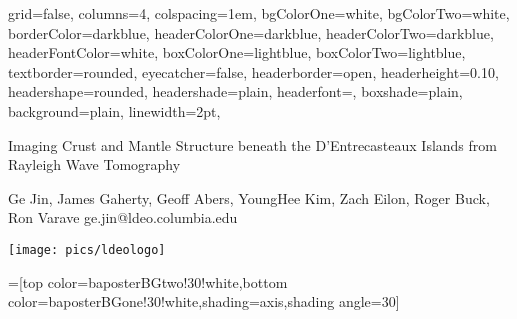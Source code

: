 \documentclass[paperwidth=65in,paperheight=43in,landscape,final,fontscale=0.23]{baposter}
\begin{document}
\begin{poster}{
  grid=false,
  columns=4,
  colspacing=1em,
  bgColorOne=white,
  bgColorTwo=white,
  borderColor=darkblue,
  headerColorOne=darkblue,
  headerColorTwo=darkblue,
  headerFontColor=white,
  boxColorOne=lightblue,
  boxColorTwo=lightblue,
  textborder=rounded,
  eyecatcher=false,
  headerborder=open,
  headerheight=0.10\textheight,  %
  headershape=rounded,
  headershade=plain,
  headerfont=\LARGE\textsf, %
  boxshade=plain,
  background=plain,
  linewidth=2pt,
  }
  {} %
  {\sf %
  \vspace{0.8em}

  Imaging Crust and Mantle Structure beneath the D'Entrecasteaux 
  Islands from Rayleigh Wave Tomography}
  {\sf %
  Ge Jin, James Gaherty, Geoff Abers, YoungHee Kim, Zach Eilon, Roger Buck, Ron Varave\hspace{1em}
  ge.jin@ldeo.columbia.edu
  }
  {{\begin{minipage}{30em}
    \hfill
	\vfill
    \texttt{[image: pics/ldeologo]}
  \end{minipage}}
  }

  =[top color=baposterBGtwo!30!white,bottom color=baposterBGone!30!white,shading=axis,shading angle=30]

     \newlength{\leftimgwidth}
     \setlength{\leftimgwidth}{0.78em+8.0em}


\end{poster}
\end{document}
